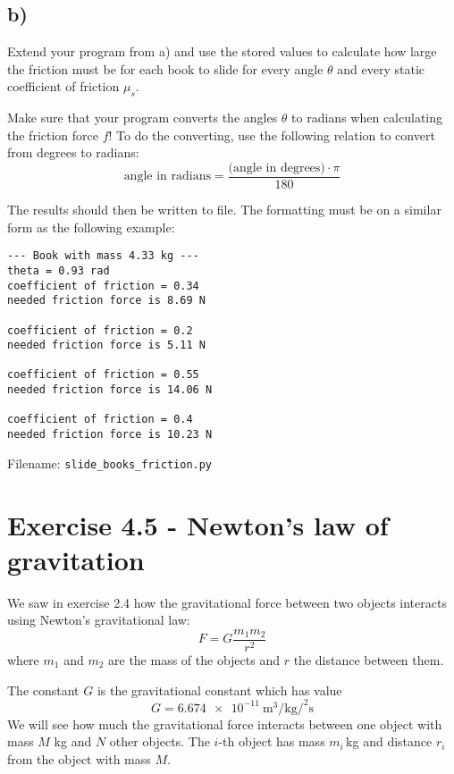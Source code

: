 \documentclass[10pt,a4paper]{article}
\begin{document}
\subsection*{b)}
Extend your program from a) and use the stored values to calculate how large the friction must be for each book to slide for every angle $\theta$ and every static coefficient of friction $\mu_s$. 

Make sure that your program converts the angles $\theta$ to radians when calculating the friction force $f$! To do the converting, use the following relation to convert from degrees to radians: 
\[
\text{angle in radians} = \frac{\text{(angle in degrees)} \cdot \pi}{180}
\]

\newpage
The results should then be written to file. The formatting must be on a similar form as the following example:
\begin{verbatim}
--- Book with mass 4.33 kg ---
theta = 0.93 rad
coefficient of friction = 0.34
needed friction force is 8.69 N

coefficient of friction = 0.2
needed friction force is 5.11 N

coefficient of friction = 0.55
needed friction force is 14.06 N

coefficient of friction = 0.4
needed friction force is 10.23 N
\end{verbatim}

Filename: \texttt{slide\_books\_friction.py}


\section*{Exercise 4.5 - Newton's law of gravitation}
We saw in exercise 2.4 how the gravitational force between two objects interacts using Newton's gravitational law:
	\begin{equation*}
	F = G\frac{m_1m_2}{r^2}
	\end{equation*}
where $m_1$ and $m_2$  are the mass of the objects and $r$ the distance between them. 

The constant $G$ is the gravitational constant which has value
\[
G = \SI{6.674e-11}{\cubic\meter\per\kilogram\per\squared\second}
\]
We will see how much the gravitational force interacts between one object with mass $M$ kg and $N$ other objects. The $i$-th object has mass $m_i\,$kg and distance $r_i$ from the object with mass $M$. 
\end{document}
